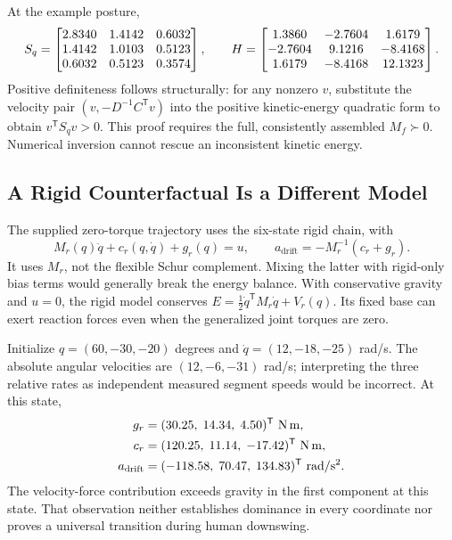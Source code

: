 At the example posture,
\begin{equation}
 S_q=\begin{bmatrix}2.8340 & 1.4142 & 0.6032 \\ 1.4142 & 1.0103 & 0.5123 \\ 0.6032 & 0.5123 & 0.3574\end{bmatrix},\qquad
 H=\begin{bmatrix}1.3860 & -2.7604 & 1.6179 \\ -2.7604 & 9.1216 & -8.4168 \\ 1.6179 & -8.4168 & 12.1323\end{bmatrix}.
\end{equation}
Positive definiteness follows structurally: for any nonzero $v$, substitute the velocity pair $(v,-D^{-1}C^{\mathsf T}v)$ into the positive kinetic-energy quadratic form to obtain $v^{\mathsf T}S_qv>0$. This proof requires the full, consistently assembled $M_f\succ0$. Numerical inversion cannot rescue an inconsistent kinetic energy.

\subsection{A Rigid Counterfactual Is a Different Model}

The supplied zero-torque trajectory uses the six-state rigid chain, with
\begin{equation}
 M_r(q)\ddot q+c_r(q,\dot q)+g_r(q)=u,\qquad
 a_{\mathrm{drift}}=-M_r^{-1}(c_r+g_r).
\end{equation}
It uses $M_r$, not the flexible Schur complement. Mixing the latter with rigid-only bias terms would generally break the energy balance. With conservative gravity and $u=0$, the rigid model conserves $E=\tfrac12\dot q^{\mathsf T}M_r\dot q+V_r(q)$. Its fixed base can exert reaction forces even when the generalized joint torques are zero.

Initialize $q=(60,-30,-20)$ degrees and $\dot q=(12,-18,-25)$ rad/s. The absolute angular velocities are $(12,-6,-31)$ rad/s; interpreting the three relative rates as independent measured segment speeds would be incorrect. At this state,
\begin{equation}
\begin{aligned}
 g_r&=(\cheightGravity)^{\mathsf T}\ \mathrm{N\,m},\\
 c_r&=(\cheightCoriolisTerm)^{\mathsf T}\ \mathrm{N\,m},\\
 a_{\mathrm{drift}}&=(\cheightDriftAccel)^{\mathsf T}\ \mathrm{rad/s^2}.
\end{aligned}
\end{equation}
The velocity-force contribution exceeds gravity in the first component at this state. That observation neither establishes dominance in every coordinate nor proves a universal transition during human downswing.

